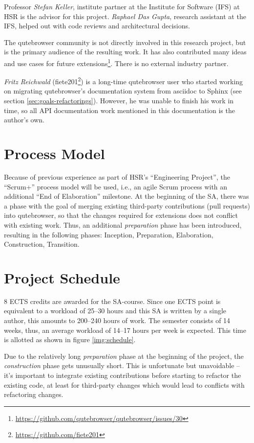 Professor \emph{Stefan Keller}, institute partner at the Institute for Software
(IFS) at HSR is the advisor for this project. \emph{Raphael Das Gupta}, research
assistant at the IFS, helped out with code reviews and architectural decisions.

The qutebrowser community is not directly involved in this research project, but
is the primary audience of the resulting work. It has also contributed many
ideas and use cases for future
extensions\footnote{\url{https://github.com/qutebrowser/qutebrowser/issues/30}}.
There is no external industry partner.

\label{fiete}
\emph{Fritz Reichwald} (fiete201\footnote{\url{https://github.com/fiete201}})
is a long-time qutebrowser user who started working on migrating qutebrowser's
documentation system from asciidoc to Sphinx (see section
\ref{sec:goals-refactorings}). However, he was unable to finish his work in
time, so all API documentation work mentioned in this documentation is the
author's own.

\section{Process Model}
Because of previous experience as part of HSR's ``Engineering Project'', the
``Scrum+'' process model will be used, i.e., an agile Scrum process with an
additional ``End of Elaboration'' milestone. At the beginning of the SA, there was a phase with the goal of merging existing
third-party contributions (pull requests) into qutebrowser, so that the changes
required for extensions does not conflict with existing work. Thus, an additional
\emph{preparation} phase has been introduced, resulting in the following phases:
Inception, Preparation, Elaboration, Construction, Transition.

\section{Project Schedule}
\label{schedule}

8 ECTS credits are awarded for the SA-course. Since one ECTS point is equivalent
to a workload of 25--30 hours \autocite{ects} and this SA is written by a single
author, this amounts to 200--240 hours of work. The semester consists of 14
weeks, thus, an average workload of 14--17 hours per week is expected. This time
is allotted as shown in figure \ref{img:schedule}.

Due to the relatively long \emph{preparation} phase at the beginning of the
project, the \emph{construction} phase gets unusually short. This is
unfortunate but unavoidable -- it's important to integrate existing
contributions before starting to refactor the existing code, at least for
third-party changes which would lead to conflicts with refactoring changes.

